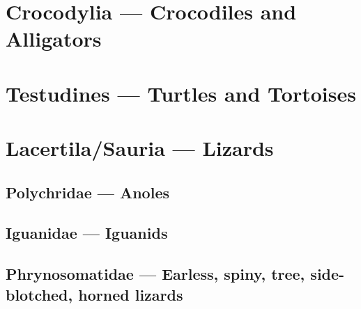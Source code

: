 \documentclass{article}
\begin{document}
\tableofcontents
\pagebreak
\section{Crocodylia --- Crocodiles and Alligators}

\pagebreak

\pagebreak
\section{Testudines --- Turtles and Tortoises}

\pagebreak

\pagebreak

\pagebreak

\pagebreak

\pagebreak

\pagebreak

\pagebreak

\pagebreak

\pagebreak

\pagebreak

\pagebreak

\pagebreak

\pagebreak

\pagebreak

\pagebreak

\pagebreak

\pagebreak
\section{Lacertila/Sauria --- Lizards}

\pagebreak
\subsection{Polychridae --- Anoles}

\pagebreak
\subsection{Iguanidae --- Iguanids}

\pagebreak

\pagebreak

\pagebreak

\pagebreak
\subsection{Phrynosomatidae --- Earless, spiny, tree, side-blotched, horned lizards}

\pagebreak

\pagebreak

\pagebreak

\end{document}
